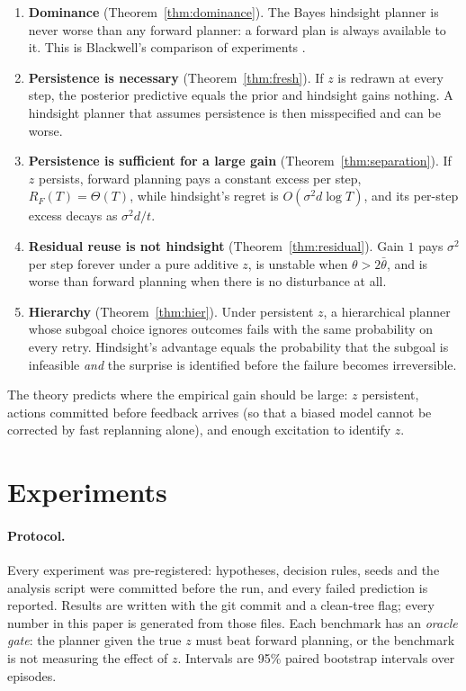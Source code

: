 \documentclass[11pt]{article}
\begin{document}
\begin{enumerate}
\item \textbf{Dominance} (Theorem~\ref{thm:dominance}). The Bayes hindsight planner is never worse than any forward
planner: a forward plan is always available to it. This is Blackwell's comparison of experiments
\citep{blackwell1953}.
\item \textbf{Persistence is necessary} (Theorem~\ref{thm:fresh}). If $z$ is redrawn at every step, the posterior
predictive equals the prior and hindsight gains nothing. A hindsight planner that assumes persistence is then
misspecified and can be worse.
\item \textbf{Persistence is sufficient for a large gain} (Theorem~\ref{thm:separation}). If $z$ persists, forward
planning pays a constant excess per step, $R_F(T)=\Theta(T)$, while hindsight's regret is $O(\sigma^2 d\log T)$, and its
per-step excess decays as $\sigma^2 d/t$.
\item \textbf{Residual reuse is not hindsight} (Theorem~\ref{thm:residual}). Gain $1$ pays $\sigma^2$ per step forever
under a pure additive $z$, is unstable when $\theta>2\bar\theta$, and is worse than forward planning when there is no
disturbance at all.
\item \textbf{Hierarchy} (Theorem~\ref{thm:hier}). Under persistent $z$, a hierarchical planner whose subgoal choice
ignores outcomes fails with the same probability on every retry. Hindsight's advantage equals the probability that the
subgoal is infeasible \emph{and} the surprise is identified before the failure becomes irreversible.
\end{enumerate}
The theory predicts where the empirical gain should be large: $z$ persistent, actions committed before feedback arrives
(so that a biased model cannot be corrected by fast replanning alone), and enough excitation to identify $z$.

\section{Experiments}
\label{sec:exp}

\paragraph{Protocol.} Every experiment was pre-registered: hypotheses, decision rules, seeds and the analysis script were
committed before the run, and every failed prediction is reported. Results are written with the git commit and a
clean-tree flag; every number in this paper is generated from those files. Each benchmark has an \emph{oracle gate}: the
planner given the true $z$ must beat forward planning, or the benchmark is not measuring the effect of $z$. Intervals are
95\% paired bootstrap intervals over episodes.
\end{document}
